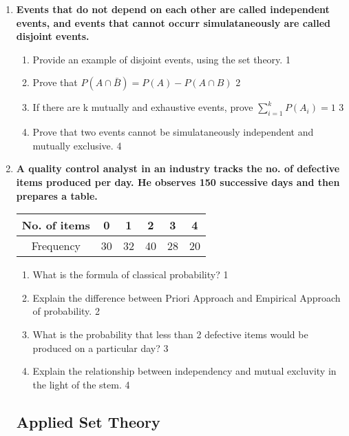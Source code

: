 \documentclass[a4paper,oneside, margin=1.4in]{book}
\begin{document}
\begin{enumerate}

     \item
	  \textbf{Events that do not depend on each other are called independent 
	  events, and events that cannot occurr simulataneously are called disjoint events.} 
  
  \begin{enumerate}
    \item
	Provide an example of disjoint events, using the set theory. \hfill 1
    \item
	Prove that $P(A\cap \bar B) = P(A) - P(A\cap B)$ \hfill 2
    \item  
	If there are k mutually and exhaustive events, prove 
	$\displaystyle \sum_{i=1}^k P(A_i) = 1$ \hfill 3
    \item
	Prove that two events cannot be simulataneously independent and mutually 
	exclusive. \hfill 4
  \end{enumerate}

 \item
	  \textbf{A quality control analyst in an industry tracks the no. 
	  of defective items produced per day. He observes 150 successive days 
	  and then prepares a table.} 
	  
	  \begin{table}[h]
	  \centering
\begin{tabular}{c|c|c|c|c|c} \hline
No. of items & 0 & 1 & 2 & 3 & 4 \\ \hline
Frequency & 30 & 32 & 40 & 28 & 20 \\ \hline
\end{tabular}
\end{table}
  
  \begin{enumerate}
    \item
	What is the formula of classical probability? \hfill 1
    \item
	Explain the difference between Priori Approach and Empirical Approach 
	of probability. \hfill 2
    \item  
	What is the probability that less than 2 defective items would be produced 
	on a particular day? \hfill 3
    \item
	Explain the relationship between independency and mutual excluvity in the 
	light of the stem. \hfill 4
  \end{enumerate}
  

  \subsection{Applied Set Theory}
  

\end{enumerate}
\end{document}
